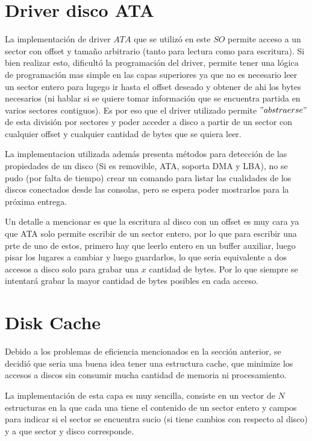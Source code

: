 \documentclass[english]{article}
\begin{document}
\section{Driver disco ATA}

La implementación de driver $ATA$ que se utilizó en este $SO$ permite
acceso a un sector con offset y tamaño arbitrario (tanto para lectura
como para escritura). Si bien realizar esto, dificultó la programación
del driver, permite tener una lógica de programación mas simple en
las capas superiores ya que no es necesario leer un sector entero
para lugego ir hasta el offset deseado y obtener de ahi los bytes
necesarios (ni hablar si se quiere tomar información que se encuentra
partida en varios sectores contiguos). Es por eso que el driver utilizado
permite $"abstraerse"$ de esta división por sectores y poder acceder
a disco a partir de un sector con cualquier offset y cualquier cantidad
de bytes que se quiera leer.

La implementacion utilizada además presenta métodos para detección
de las propiedades de un disco (Si es removible, ATA, soporta DMA
y LBA), no se pudo (por falta de tiempo) crear un comando para listar
las cualidades de los discos conectados desde las consolas, pero se
espera poder mostrarlos para la próxima entrega.

Un detalle a mencionar es que la escritura al disco con un offset
es muy cara ya que ATA solo permite escribir de un sector entero,
por lo que para escribir una prte de uno de estos, primero hay que
leerlo entero en un buffer auxiliar, luego pisar los lugares a cambiar
y luego guardarlos, lo que seria equivalente a dos accesos a disco
solo para grabar una $x$ cantidad de bytes. Por lo que siempre se
intentará grabar la mayor cantidad de bytes posibles en cada acceso.

\pagebreak{}


\section{Disk Cache}

Debido a los problemas de eficiencia mencionados en la sección anterior,
se decidió que seria una buena idea tener una estructura cache, que
minimize los accesos a discos sin consumir mucha cantidad de memoria
ni procesamiento. 

La implementación de esta capa es muy sencilla, consiste en un vector
de $N$ estructuras en la que cada una tiene el contenido de un sector
entero y campos para indicar si el sector se encuentra sucio (si tiene
cambios con respecto al disco) y a que sector y disco corresponde.
\end{document}
